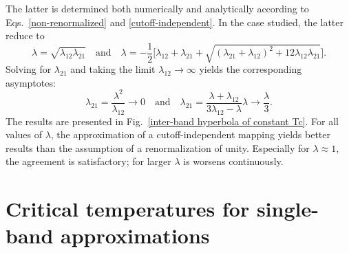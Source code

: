 The latter is determined both numerically and analytically according to
Eqs.~\ref{non-renormalized} and \ref{cutoff-independent}. In the case studied,
the latter reduce to
%
\begin{equation*}
    \lambda = \sqrt{\lambda_{1 2} \lambda_{2 1}}
    \quad \text{and} \quad
    \lambda = -\frac 1 2 \Big[ \lambda_{1 2} + \lambda_{2 1} + \sqrt{
        (\lambda_{2 1} + \lambda_{1 2})^2
        + 12 \lambda_{1 2} \lambda_{2 1}
        }
    \Big].
\end{equation*}
%
Solving for $\lambda_{2 1}$ and taking the limit $\lambda_{1 2} \rightarrow
\infty$ yields the corresponding asymptotes:
%
\begin{equation*}
    \lambda_{2 1} = \frac{\lambda^2}{\lambda_{1 2}} \rightarrow 0
    \quad \text{and} \quad
    \lambda_{2 1} = \frac{\lambda + \lambda_{1 2}}{3 \lambda_{1 2} - \lambda}
    \lambda \rightarrow \frac \lambda 3.
\end{equation*}
%
The results are presented in Fig.~\ref{inter-band hyperbola of constant Tc}. For
all values of $\lambda$, the approximation of a cutoff-independent mapping
yields better results than the assumption of a renormalization of unity.
Especially for $\lambda \approx 1$, the agreement is satisfactory; for larger
$\lambda$ is worsens continuously.

\section{Critical temperatures for single-band approximations}

